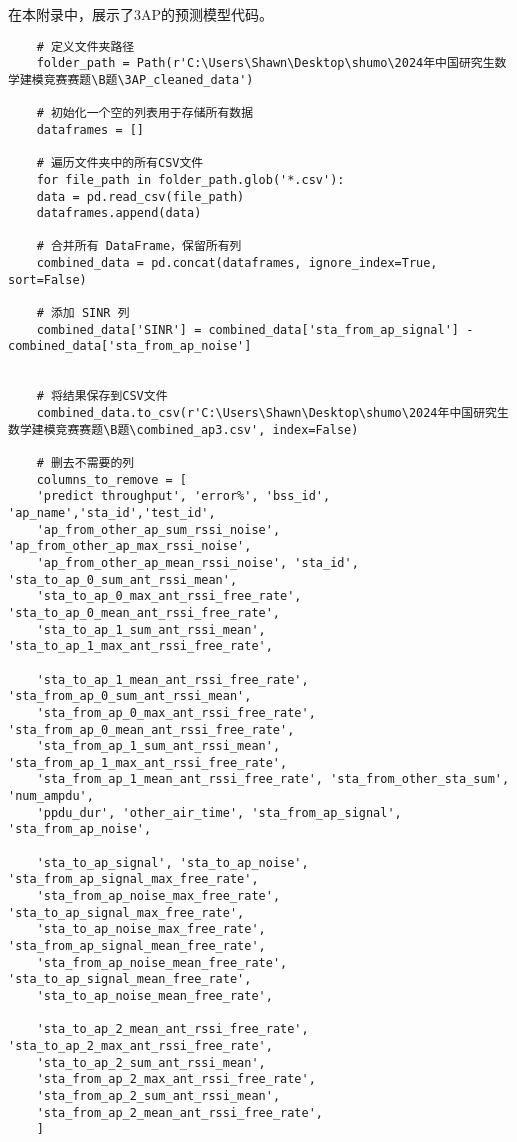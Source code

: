 \documentclass[bwprint,fontset=windows]{gmcmthesis}
\begin{document}
\noindent 在本附录中，展示了3AP的预测模型代码。

\begin{lstlisting}
	# 定义文件夹路径
	folder_path = Path(r'C:\Users\Shawn\Desktop\shumo\2024年中国研究生数学建模竞赛赛题\B题\3AP_cleaned_data')
	
	# 初始化一个空的列表用于存储所有数据
	dataframes = []
	
	# 遍历文件夹中的所有CSV文件
	for file_path in folder_path.glob('*.csv'):
	data = pd.read_csv(file_path)
	dataframes.append(data)
	
	# 合并所有 DataFrame，保留所有列
	combined_data = pd.concat(dataframes, ignore_index=True, sort=False)
	
	# 添加 SINR 列
	combined_data['SINR'] = combined_data['sta_from_ap_signal'] - combined_data['sta_from_ap_noise']
	
	
	# 将结果保存到CSV文件
	combined_data.to_csv(r'C:\Users\Shawn\Desktop\shumo\2024年中国研究生数学建模竞赛赛题\B题\combined_ap3.csv', index=False)
	
	# 删去不需要的列
	columns_to_remove = [
	'predict throughput', 'error%', 'bss_id', 'ap_name','sta_id','test_id',
	'ap_from_other_ap_sum_rssi_noise', 'ap_from_other_ap_max_rssi_noise',
	'ap_from_other_ap_mean_rssi_noise', 'sta_id', 'sta_to_ap_0_sum_ant_rssi_mean',
	'sta_to_ap_0_max_ant_rssi_free_rate', 'sta_to_ap_0_mean_ant_rssi_free_rate',
	'sta_to_ap_1_sum_ant_rssi_mean', 'sta_to_ap_1_max_ant_rssi_free_rate',
	
	'sta_to_ap_1_mean_ant_rssi_free_rate', 'sta_from_ap_0_sum_ant_rssi_mean',
	'sta_from_ap_0_max_ant_rssi_free_rate', 'sta_from_ap_0_mean_ant_rssi_free_rate',
	'sta_from_ap_1_sum_ant_rssi_mean', 'sta_from_ap_1_max_ant_rssi_free_rate',
	'sta_from_ap_1_mean_ant_rssi_free_rate', 'sta_from_other_sta_sum', 'num_ampdu',
	'ppdu_dur', 'other_air_time', 'sta_from_ap_signal', 'sta_from_ap_noise',
	
	'sta_to_ap_signal', 'sta_to_ap_noise', 'sta_from_ap_signal_max_free_rate',
	'sta_from_ap_noise_max_free_rate', 'sta_to_ap_signal_max_free_rate',
	'sta_to_ap_noise_max_free_rate', 'sta_from_ap_signal_mean_free_rate',
	'sta_from_ap_noise_mean_free_rate', 'sta_to_ap_signal_mean_free_rate',
	'sta_to_ap_noise_mean_free_rate',
	
	'sta_to_ap_2_mean_ant_rssi_free_rate', 'sta_to_ap_2_max_ant_rssi_free_rate',
	'sta_to_ap_2_sum_ant_rssi_mean',           
	'sta_from_ap_2_max_ant_rssi_free_rate',    
	'sta_from_ap_2_sum_ant_rssi_mean',         
	'sta_from_ap_2_mean_ant_rssi_free_rate',
	]
	

\end{lstlisting}
\end{document}
